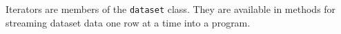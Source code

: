 
Iterators are members of the \texttt{dataset} class.  They are
available in methods for streaming dataset data one row at a time into
a program.

